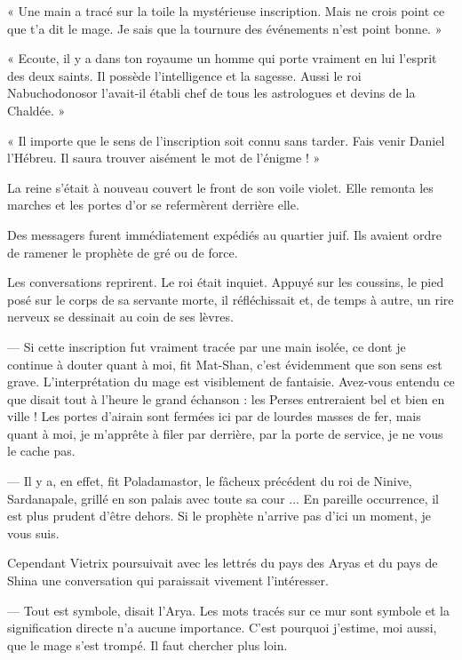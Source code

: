 \documentclass[a4paper, 11pt, oneside, polutonikogreek, french]{article}
\begin{document}
« Une main a tracé sur la toile la mystérieuse inscription. Mais ne crois point ce que t'a dit le mage. Je sais que la tournure des événements n'est point bonne. »

« Ecoute, il y a dans ton royaume un homme qui porte vraiment en lui l'esprit des deux saints. Il possède l'intelligence et la sagesse. Aussi le roi Nabuchodonosor l'avait-il établi chef de tous les astrologues et devins de la Chaldée. »

« Il importe que le sens de l'inscription soit connu sans tarder. Fais venir Daniel l'Hébreu. Il saura trouver aisément le mot de l'énigme ! »

La reine s'était à nouveau couvert le front de son voile violet. Elle remonta les marches et les portes d'or se refermèrent derrière elle.

\bigskip
\centerline{\EightStarTaper}
\centerline{\EightStarTaper\EightStarTaper}
\bigskip

Des messagers furent immédiatement expédiés au quartier juif. Ils avaient ordre de ramener le prophète de gré ou de force.

Les conversations reprirent. Le roi était inquiet. Appuyé sur les coussins, le pied posé sur le corps de sa servante morte, il réfléchissait et, de temps à autre, un rire nerveux se dessinait au coin de ses lèvres.

--- Si cette inscription fut vraiment tracée par une main isolée, ce dont je continue à douter quant à moi, fit Mat-Shan, c'est évidemment que son sens est grave. L'interprétation du mage est visiblement de fantaisie. Avez-vous entendu ce que disait tout à l'heure le grand échanson : les Perses entreraient bel et bien en ville ! Les portes d'airain sont fermées ici par de lourdes masses de fer, mais quant à moi, je m'apprête à filer par derrière, par la porte de service, je ne vous le cache pas.

--- Il y a, en effet, fit Poladamastor, le fâcheux précédent du roi de Ninive, Sardanapale, grillé en son palais avec toute sa cour ... En pareille occurrence, il est plus prudent d'être dehors. Si le prophète n'arrive pas d'ici un moment, je vous suis.

Cependant Vietrix poursuivait avec les lettrés du pays des Aryas et du pays de Shina une conversation qui paraissait vivement l'intéresser.

--- Tout est symbole, disait l'Arya. Les mots tracés sur ce mur sont symbole et la signification directe n'a aucune importance. C'est pourquoi j'estime, moi aussi, que le mage s'est trompé. Il faut chercher plus loin.
\end{document}
